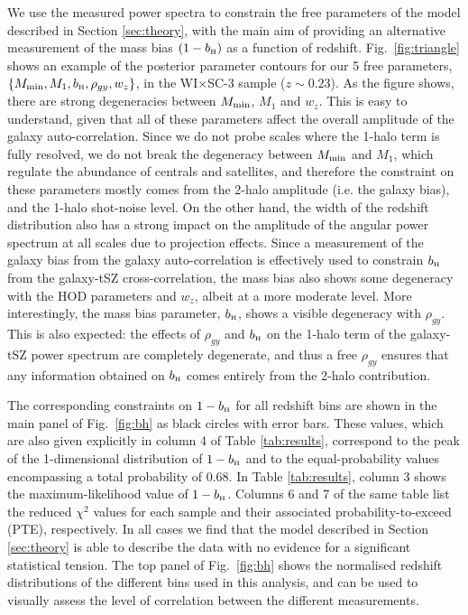 \documentclass[useAMS,usenatbib]{mn2e}
\newcommand{\wisc}{WI$\times$SC}
\def\bH{b_{\scriptscriptstyle\rm H}}
\begin{document}
      We use the measured power spectra to constrain the free parameters of the model described in Section \ref{sec:theory}, with the main aim of providing an alternative measurement of the mass bias $(1-\bH)$ as a function of redshift. Fig.\!~\ref{fig:triangle} shows an example of the posterior parameter contours for our 5 free parameters, $\{M_{\rm min},M_1,\bH,\rho_{gy},w_z\}$, in the \wisc-3 sample ($z\sim0.23$). As the figure shows, there are strong degeneracies between $M_{\rm min}$, $M_1$ and $w_z$. This is easy to understand, given that all of these parameters affect the overall amplitude of the galaxy auto-correlation. Since we do not probe scales where the 1-halo term is fully resolved, we do not break the degeneracy between $M_{\rm min}$ and $M_1$, which regulate the abundance of centrals and satellites, and therefore the constraint on these parameters mostly comes from the 2-halo amplitude (i.e. the galaxy bias), and the 1-halo shot-noise level. On the other hand, the width of the redshift distribution also has a strong impact on the amplitude of the angular power spectrum at all scales due to projection effects. Since a measurement of the galaxy bias from the galaxy auto-correlation is effectively used to constrain $\bH$ from the galaxy-tSZ cross-correlation, the mass bias also shows some degeneracy with the HOD parameters and $w_z$, albeit at a more moderate level. More interestingly, the mass bias parameter, $\bH$, shows a visible degeneracy with $\rho_{gy}$. This is also expected: the effects of $\rho_{gy}$ and $\bH$ on the 1-halo term of the galaxy-tSZ power spectrum are completely degenerate, and thus a free $\rho_{gy}$ ensures that any information obtained on $\bH$ comes entirely from the 2-halo contribution.
      
      The corresponding constraints on $1-\bH$ for all redshift bins are shown in the main panel of Fig.\!~\ref{fig:bh} as black circles with error bars. These values, which are also given explicitly in column 4 of Table \ref{tab:results}, correspond to the peak of the 1-dimensional distribution of $1-\bH$ and to the equal-probability values encompassing a total probability of 0.68. In Table \ref{tab:results}, column 3 shows the maximum-likelihood value of $1-\bH$. Columns 6 and 7 of the same table list the reduced $\chi^2$ values for each sample and their associated probability-to-exceed (PTE), respectively. In all cases we find that the model described in Section \ref{sec:theory} is able to describe the data with no evidence for a significant statistical tension. The top panel of Fig.\!~\ref{fig:bh} shows the normalised redshift distributions of the different bins used in this analysis, and can be used to visually assess the level of correlation between the different measurements.
      
\end{document}
